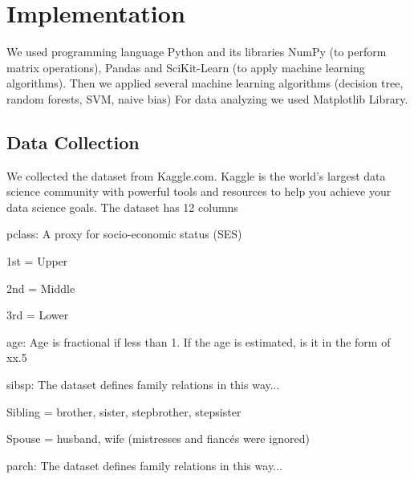 \documentclass[11pt]{article} %
\begin{document}




\section{Implementation} %
We used programming language Python and its libraries NumPy (to perform matrix operations), Pandas and SciKit-Learn (to apply machine learning algorithms). Then we applied several machine learning algorithms (decision tree, random forests, SVM, naive bias)
For data analyzing we used Matplotlib Library.

\subsection{Data Collection}
We collected the dataset from Kaggle.com. Kaggle is the world's largest data science community with powerful tools and resources to help you achieve your data science goals. The dataset has 12 columns

pclass: A proxy for socio-economic status (SES)

1st = Upper

2nd = Middle

3rd = Lower

age: Age is fractional if less than 1. If the age is estimated, is it in the form of xx.5

sibsp: The dataset defines family relations in this way...

Sibling = brother, sister, stepbrother, stepsister

Spouse = husband, wife (mistresses and fiancés were ignored)

parch: The dataset defines family relations in this way...
\end{document}
